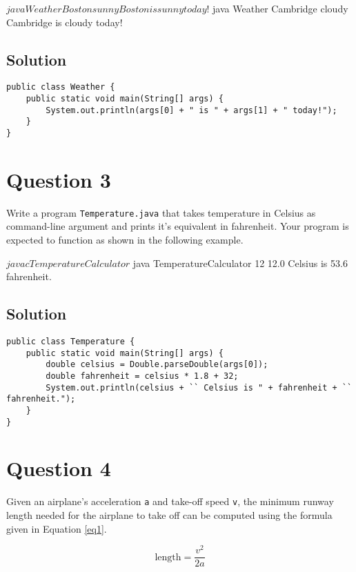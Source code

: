 \begin{terminal}
$ java Weather Boston sunny
Boston is sunny today!
$ java Weather Cambridge cloudy
Cambridge is cloudy today!
\end{terminal}

\subsection*{Solution}
\lstset{language=Java,tabsize=2}
\begin{lstlisting}
public class Weather {
	public static void main(String[] args) {
		System.out.println(args[0] + " is " + args[1] + " today!");
	}
}
\end{lstlisting}

\section*{Question 3}
Write a program \texttt{Temperature.java} that takes temperature in Celsius as command-line argument and prints it's equivalent in fahrenheit. Your program is expected to function as shown in the following example.

\begin{terminal}
$ javac TemperatureCalculator
$ java TemperatureCalculator 12
12.0 Celsius is 53.6 fahrenheit.
\end{terminal}

\subsection*{Solution}
\lstset{language=Java,tabsize=2}
\begin{lstlisting}
public class Temperature {
	public static void main(String[] args) {
		double celsius = Double.parseDouble(args[0]);
		double fahrenheit = celsius * 1.8 + 32;
		System.out.println(celsius + `` Celsius is " + fahrenheit + `` fahrenheit.");
	}
}
\end{lstlisting}

\section*{Question 4}
Given an airplane's acceleration \texttt{a} and take-off speed \texttt{v}, the minimum runway length needed for the airplane to take off can be computed using the formula given in Equation \ref{eq1}.

\begin{equation}
\textrm{length} = \frac{v^2}{2a}
\label{eq1}
\end{equation}

